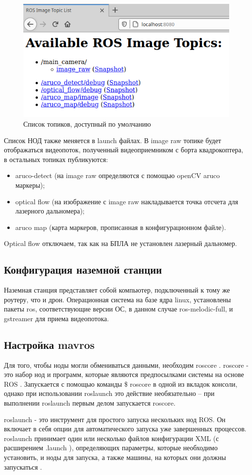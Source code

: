 \begin{figure}[H]
	\centering
	\includegraphics[width=0.5\linewidth]{../RW/pics/topic}
	\caption{Список топиков, доступный по умолчанию
	}
	\label{fig:topic}
\end{figure}

Список НОД также меняется в launch файлах. В image raw топике будет отображаться видеопоток, полученный видеоприемником с борта квадрокоптера, в остальных топиках публикуются:
\begin{itemize}
	\item aruco-detect (на image raw определяются с помощью openCV aruco маркеры);
	\item optical flow (на изображение с image raw накладывается точка отсчета для лазерного дальномера);
	\item aruco map (карта маркеров, прописанная в конфигурационном файле).
\end{itemize}

Optical flow отключаем, так как на БПЛА не установлен лазерный дальномер.
\subsection{Конфигурация наземной станции}
Наземная станция представляет собой компьютер, подключенный к тому же роутеру, что и дрон. Операционная система на базе ядра linux, установлены пакеты ros, соответствующие версии ОС, в данном случае ros-melodic-full, и gstreamer для приема видеопотока.

\subsection{Настройка mavros}
Для того, чтобы ноды могли обмениваться данными, необходим roscore \cite{pkg}. roscore - это набор нод и программ, которые являются предпосылками системы на основе ROS \cite{ros}. Запускается с помощью команды \$ roscore в одной из вкладок консоли, однако при использовании roslaunch это действие необязательно -- при выполнении roslaunch первым делом запускается roscore.

roslaunch - это инструмент для простого запуска нескольких нод ROS. Он включает в себя опции для автоматического запуска уже завершенных процессов. roslaunch принимает один или несколько файлов конфигурации XML (с расширением .launch ), определяющих параметры, которые необходимо установить, и ноды для запуска, а также машины, на которых они должны запускаться \cite{ros}.

